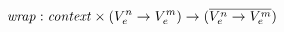 \documentclass[preview]{standalone}
\begin{document}
\begin{equation*}%
\mathit{wrap} : \mathit{context} \times (V^n_e \rightarrow V^m_e) \rightarrow (\wrapdf{V^n_e \rightarrow V^m_e})
\end{equation*}
\end{document}
